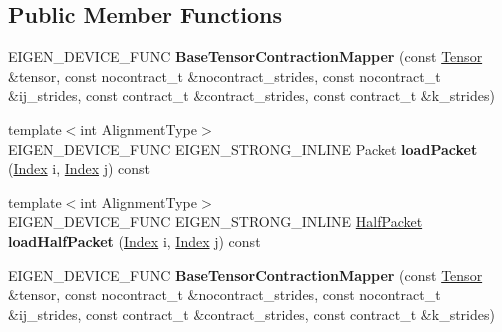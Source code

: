 \subsection*{Public Member Functions}
\begin{DoxyCompactItemize}
\item 
\mbox{\label{class_eigen_1_1internal_1_1_base_tensor_contraction_mapper_ad9d679a86f141239fa3742787c73b2e2}} 
E\+I\+G\+E\+N\+\_\+\+D\+E\+V\+I\+C\+E\+\_\+\+F\+U\+NC {\bfseries Base\+Tensor\+Contraction\+Mapper} (const \hyperlink{class_eigen_1_1_tensor}{Tensor} \&tensor, const nocontract\+\_\+t \&nocontract\+\_\+strides, const nocontract\+\_\+t \&ij\+\_\+strides, const contract\+\_\+t \&contract\+\_\+strides, const contract\+\_\+t \&k\+\_\+strides)
\item 
\mbox{\label{class_eigen_1_1internal_1_1_base_tensor_contraction_mapper_ae5029de464b3b11235e822404e81a464}} 
{\footnotesize template$<$int Alignment\+Type$>$ }\\E\+I\+G\+E\+N\+\_\+\+D\+E\+V\+I\+C\+E\+\_\+\+F\+U\+NC E\+I\+G\+E\+N\+\_\+\+S\+T\+R\+O\+N\+G\+\_\+\+I\+N\+L\+I\+NE Packet {\bfseries load\+Packet} (\hyperlink{namespace_eigen_a62e77e0933482dafde8fe197d9a2cfde}{Index} i, \hyperlink{namespace_eigen_a62e77e0933482dafde8fe197d9a2cfde}{Index} j) const
\item 
\mbox{\label{class_eigen_1_1internal_1_1_base_tensor_contraction_mapper_aeb8735af5f4ed04f6001addde8fae7ef}} 
{\footnotesize template$<$int Alignment\+Type$>$ }\\E\+I\+G\+E\+N\+\_\+\+D\+E\+V\+I\+C\+E\+\_\+\+F\+U\+NC E\+I\+G\+E\+N\+\_\+\+S\+T\+R\+O\+N\+G\+\_\+\+I\+N\+L\+I\+NE \hyperlink{union_eigen_1_1internal_1_1_packet}{Half\+Packet} {\bfseries load\+Half\+Packet} (\hyperlink{namespace_eigen_a62e77e0933482dafde8fe197d9a2cfde}{Index} i, \hyperlink{namespace_eigen_a62e77e0933482dafde8fe197d9a2cfde}{Index} j) const
\item 
\mbox{\label{class_eigen_1_1internal_1_1_base_tensor_contraction_mapper_ad9d679a86f141239fa3742787c73b2e2}} 
E\+I\+G\+E\+N\+\_\+\+D\+E\+V\+I\+C\+E\+\_\+\+F\+U\+NC {\bfseries Base\+Tensor\+Contraction\+Mapper} (const \hyperlink{class_eigen_1_1_tensor}{Tensor} \&tensor, const nocontract\+\_\+t \&nocontract\+\_\+strides, const nocontract\+\_\+t \&ij\+\_\+strides, const contract\+\_\+t \&contract\+\_\+strides, const contract\+\_\+t \&k\+\_\+strides)

\end{DoxyCompactItemize}
